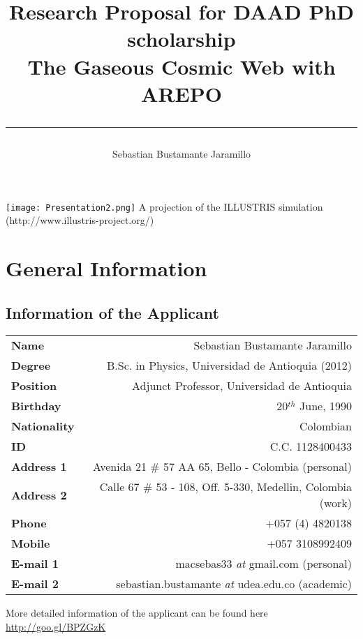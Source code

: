 \documentclass[a4,useAMS,usenatbib,usegraphicx,12pt]{article}
\title{{\textbf{Research Proposal for DAAD PhD scholarship}}\\ The Gaseous Cosmic Web with AREPO\\ \color{black}\rule{15cm}{0.5mm}}
\author{Sebastian Bustamante Jaramillo}
\date{}
\begin{document}
\maketitle
\begin{center}
\texttt{[image: Presentation2.png]}
\tiny{A projection of the ILLUSTRIS simulation (http://www.illustris-project.org/)}
\end{center}
\tableofcontents
 
\newpage 

\section{General Information}
\small
\subsection*{Information of the Applicant}
\begin{tabular}{L!{\VRule}R}
\bf Name		& Sebastian Bustamante Jaramillo\\
\bf Degree		& B.Sc. in Physics, Universidad de Antioquia (2012)\\
\bf Position	& Adjunct Professor, Universidad de Antioquia\\
\bf Birthday	& { 20$^{th}$ June, 1990}\\
\bf Nationality & Colombian\\
\bf ID			& C.C. 1128400433\\
\bf Address 1	& Avenida 21 \# 57 AA 65, Bello - Colombia (personal)\\
\bf Address 2	& Calle 67 \# 53 - 108, Off. 5-330, Medellin, Colombia (work)\\
\bf Phone		& +057 (4) 4820138\\
\bf Mobile		& +057 3108992409\\
\bf E-mail 1	& macsebas33 \textit{at} gmail.com (personal)\\
\bf E-mail 2	& sebastian.bustamante \textit{at} udea.edu.co (academic)\\
\end{tabular}

\vspace{10pt}

More detailed information of the applicant can be found here \url{http://goo.gl/BPZGzK}

\vspace{15pt}  
\end{document}
